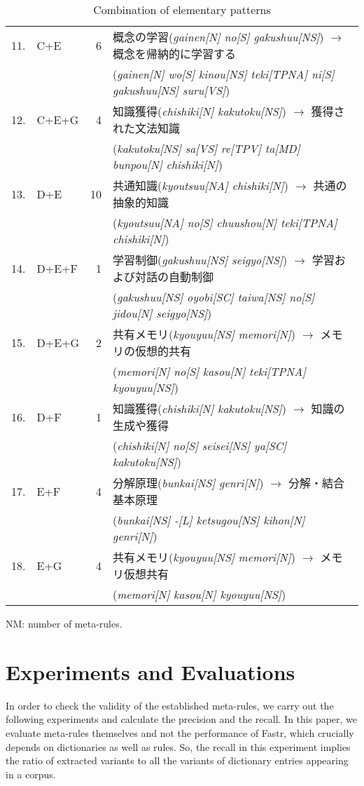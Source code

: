 {\begin{table}
\begin{center}
\begin{tabular}{|rl|r|l|}
11. & C+E & 6 & 概念の学習({\it gainen[N] no[S] gakushuu[NS]}) $\rightarrow$ 概念を帰納的に学習する\\
& & & ({\it gainen[N] wo[S] kinou[NS] teki[TPNA] ni[S] gakushuu[NS] suru[VS]})\\
12. & C+E+G & 4 & 知識獲得({\it chishiki[N] kakutoku[NS]}) $\rightarrow$ 獲得された文法知識\\
& & & ({\it kakutoku[NS] sa[VS] re[TPV] ta[MD] bunpou[N] chishiki[N]})\\
13. & D+E & 10 & 共通知識({\it kyoutsuu[NA] chishiki[N]}) $\rightarrow$ 共通の抽象的知識\\
& & & ({\it kyoutsuu[NA] no[S] chuushou[N] teki[TPNA] chishiki[N]})\\
14. & D+E+F & 1 & 学習制御({\it gakushuu[NS] seigyo[NS]}) $\rightarrow$ 学習および対話の自動制御\\
& & & ({\it gakushuu[NS] oyobi[SC] taiwa[NS] no[S] jidou[N] seigyo[NS]})\\
15. & D+E+G & 2 & 共有メモリ({\it kyouyuu[NS] memori[N]}) $\rightarrow$ メモリの仮想的共有\\
& & & ({\it memori[N] no[S] kasou[N] teki[TPNA] kyouyuu[NS]})\\
16. & D+F & 1 & 知識獲得({\it chishiki[N] kakutoku[NS]}) $\rightarrow$ 知識の生成や獲得\\
& & & ({\it chishiki[N] no[S] seisei[NS] ya[SC] kakutoku[NS]})\\
17. & E+F & 4 & 分解原理({\it bunkai[NS] genri[N]}) $\rightarrow$ 分解・結合基本原理\\
& & & ({\it bunkai[NS] -[L] ketsugou[NS] kihon[N] genri[N]})\\
18. & E+G & 4 & 共有メモリ({\it kyouyuu[NS] memori[N]}) $\rightarrow$ メモリ仮想共有\\
& & & ({\it memori[N] kasou[N] kyouyuu[NS]})\\
\hline
\end{tabular}
\begin{center}
NM: number of meta-rules.
\end{center}

\end{center}
\caption{Combination of elementary patterns}
\end{table}
}

\section{Experiments and Evaluations}

In order to check the validity of the established meta-rules, we carry out the following experiments and calculate the precision and the recall. In this paper, we evaluate meta-rules themselves and not the performance of Fastr, which crucially depends on dictionaries as well as rules. So, the recall in this experiment implies the ratio of extracted variants to all the variants of dictionary entries appearing in a corpus.

